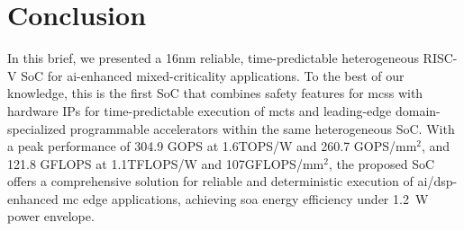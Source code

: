 \section{Conclusion}
 In this brief, we presented a 16nm reliable, time-predictable heterogeneous RISC-V SoC for \gls{ai}-enhanced mixed-criticality applications. To the best of our knowledge, this is the first SoC that combines safety features for \glspl{mcs} with hardware IPs for time-predictable execution of \glspl{mct} and leading-edge domain-specialized programmable accelerators within the same heterogeneous SoC. With a peak performance of 304.9 GOPS at 1.6TOPS/W and 260.7 GOPS/mm$^2$, and 121.8 GFLOPS at 1.1TFLOPS/W and 107GFLOPS/mm$^2$, the proposed SoC offers a comprehensive solution for reliable and deterministic execution of \gls{ai}/\gls{dsp}-enhanced \gls{mc} edge applications, achieving \gls{soa} energy efficiency under   1.2~W power envelope. %
%

